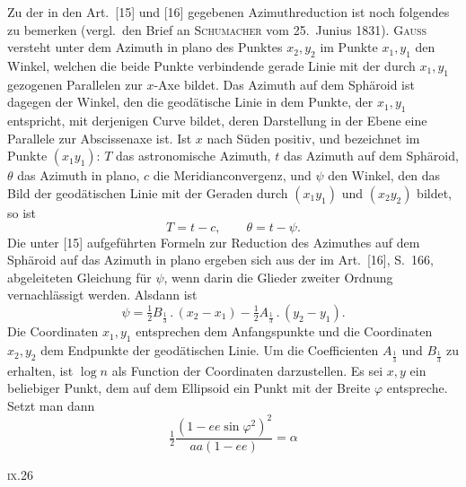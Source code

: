 {Zu der in den Art.\ [15] und [16] gegebenen Azimuthreduction ist noch folgendes zu
bemerken (vergl.\ den Brief an \textsc{Schumacher} vom 25.\ Junius 1831).
\textsc{Gauss} versteht unter dem Azimuth in plano des Punktes \(x_2,y_2\) im Punkte
\(x_1,y_1\) den Winkel, welchen die beide Punkte verbindende gerade Linie mit der durch
\(x_1,y_1\) gezogenen Parallelen zur \(x\)-Axe bildet. Das Azimuth auf dem Sphäroid ist
dagegen der Winkel, den die geodätische Linie in dem Punkte, der \(x_1,y_1\) entspricht,
mit derjenigen Curve bildet, deren Darstellung in der Ebene eine Parallele zur
Abscissenaxe ist. Ist \(x\) nach Süden positiv, und bezeichnet im Punkte \((x_1y_1)\):
\(T\) das astronomische Azimuth, \(t\) das Azimuth auf dem Sphäroid, \(\theta\) das
Azimuth in plano, \(c\) die Meridianconvergenz, und \(\psi\) den Winkel, den das Bild
der geodätischen Linie mit der Geraden durch \((x_1y_1)\) und \((x_2y_2)\) bildet, so ist
\[
T=t-c,\qquad \theta=t-\psi.
\]
Die unter [15] aufgeführten Formeln zur Reduction des Azimuthes auf dem Sphäroid auf
das Azimuth in plano ergeben sich aus der im Art.\ [16], S.\ 166, abgeleiteten
Gleichung für \(\psi\), wenn darin die Glieder zweiter Ordnung vernachlässigt werden.
Alsdann ist
\[
\psi=\tfrac12 B_{\frac13}\,.\,(x_2-x_1)-\tfrac12 A_{\frac13}\,.\,(y_2-y_1).
\]
Die Coordinaten \(x_1,y_1\) entsprechen dem Anfangspunkte und die Coordinaten \(x_2,y_2\)
dem Endpunkte der geodätischen Linie. Um die Coefficienten \(A_{\frac13}\) und
\(B_{\frac13}\) zu erhalten, ist \(\log n\) als Function der Coordinaten darzustellen.
Es sei \(x,y\) ein beliebiger Punkt, dem auf dem Ellipsoid ein Punkt mit der Breite
\(\varphi\) entspreche. Setzt man dann
\begin{equation*}
\tfrac12\frac{(1-ee\sin\varphi^2)^2}{aa(1-ee)}=\alpha
\tag*{1)}
\end{equation*}
\par}
\noindent\textsc{ix.}\hfill 26\hspace*{.12\linewidth}\par
\endgroup
